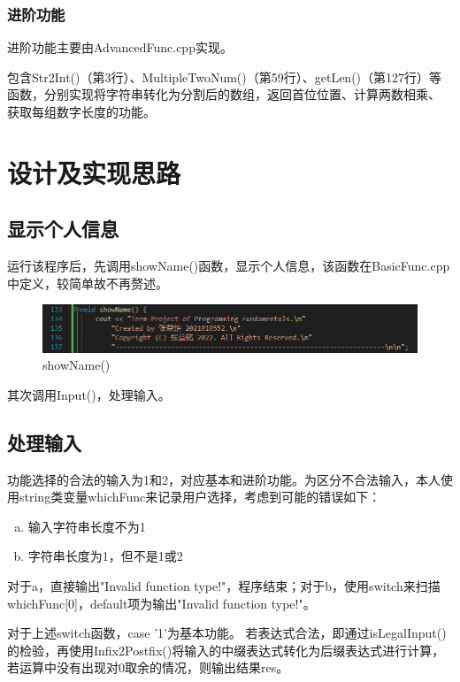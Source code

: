 \documentclass[a4paper, 11pt, UTF8]{ctexart}
\begin{document}
\subsubsection{进阶功能}

进阶功能主要由AdvancedFunc.cpp实现。

包含Str2Int()（第3行）、MultipleTwoNum()（第59行）、getLen()（第127行）等函数，分别实现将字符串转化为分割后的数组，返回首位位置、计算两数相乘、
获取每组数字长度的功能。

\section{设计及实现思路}

\subsection{显示个人信息}

运行该程序后，先调用showName()函数，显示个人信息，该函数在BasicFunc.cpp中定义，较简单故不再赘述。

\begin{figure}[H]
    \centering
    \includegraphics[width=\textwidth]{showname.png}
    \caption{showName()}
\end{figure}

其次调用Input()，处理输入。

\subsection{处理输入}

功能选择的合法的输入为1和2，对应基本和进阶功能。为区分不合法输入，本人使用string类变量whichFunc来记录用户选择，考虑到可能的错误如下：

\begin{enumerate}[a)]
    \item 输入字符串长度不为1
    \item 字符串长度为1，但不是1或2
\end{enumerate}

对于a，直接输出"Invalid function type!"，程序结束；对于b，使用switch来扫描whichFunc[0]，default项为输出"Invalid function type!"。

对于上述switch函数，case '1'为基本功能。
若表达式合法，即通过isLegalInput()的检验，再使用Infix2Postfix()将输入的中缀表达式转化为后缀表达式进行计算，
若运算中没有出现对0取余的情况，则输出结果res。
\end{document}
